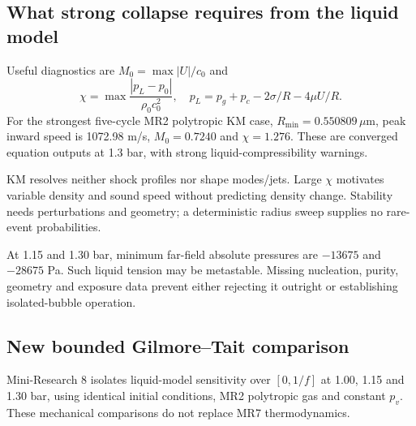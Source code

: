 \documentclass[11pt,a4paper]{article}
\begin{document}
\subsection{What strong collapse requires from the liquid model}
Useful diagnostics are $M_0=\max|U|/c_0$ and
\begin{equation}\chi=\max\frac{|p_L-p_0|}{\rho_0c_0^2},\quad p_L=p_g+p_c-2\sigma/R-4\mu U/R.\end{equation}
For the strongest five-cycle MR2 polytropic KM case, $R_{\min}=0.550809\,\mu$m, peak inward speed is 1072.98 m/s, $M_0=0.7240$ and $\chi=1.276$. These are converged equation outputs at 1.3 bar, with strong liquid-compressibility warnings.

KM resolves neither shock profiles nor shape modes/jets. Large $\chi$ motivates variable density and sound speed without predicting density change. Stability needs perturbations and geometry; a deterministic radius sweep supplies no rare-event probabilities.

At 1.15 and 1.30 bar, minimum far-field absolute pressures are $-13675$ and $-28675$ Pa. Such liquid tension may be metastable. Missing nucleation, purity, geometry and exposure data prevent either rejecting it outright or establishing isolated-bubble operation.
\subsection{New bounded Gilmore--Tait comparison}
Mini-Research 8 isolates liquid-model sensitivity over $[0,1/f]$ at 1.00, 1.15 and 1.30 bar, using identical initial conditions, MR2 polytropic gas and constant $p_v$. These mechanical comparisons do not replace MR7 thermodynamics.
\end{document}
